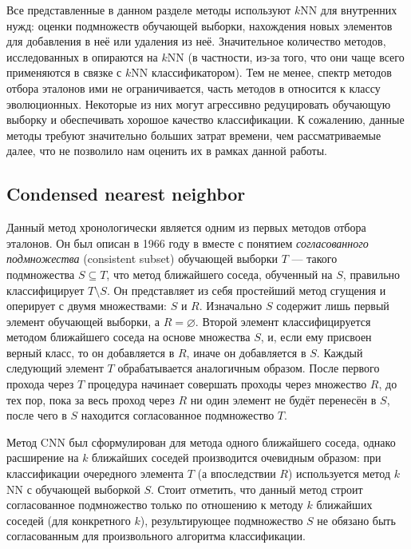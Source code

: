 Все представленные в данном разделе методы используют \(k\)NN для внутренних нужд: оценки подмножеств обучающей выборки, нахождения новых элементов для добавления в неё или удаления из неё. Значительное количество методов, исследованных в \cite{ps-taxonomy} опираются на \(k\)NN (в частности, из-за того, что они чаще всего применяются в связке с \(k\)NN классификатором). Тем не менее, спектр методов отбора эталонов ими не ограничивается, часть методов в \cite{ps-taxonomy} относится к классу эволюционных. Некоторые из них могут агрессивно редуцировать обучающую выборку и обеспечивать хорошое качество классификации. К сожалению, данные методы требуют значительно больших затрат времени, чем рассматриваемые далее, что не позволило нам оценить их в рамках данной работы.

\subsection{Condensed nearest neighbor}
Данный метод хронологически является одним из первых методов отбора эталонов. Он был описан в 1966 году в \cite{hart} вместе с понятием \emph{согласованного подмножества} (consistent subset) обучающей выборки \(T\) --- такого подмножества \(S\subseteq T\), что метод ближайшего соседа, обученный на \(S\), правильно классифицирует \(T\setminus S\). Он представляет из себя простейший метод сгущения и оперирует с двумя множествами: \(S\) и \(R\). Изначально \(S\) содержит лишь первый элемент обучающей выборки, а \(R=\varnothing\). Второй элемент классифицируется методом ближайшего соседа на основе множества \(S\), и, если ему присвоен верный класс, то он добавляется в \(R\), иначе он добавляется в \(S\). Каждый следующий элемент \(T\) обрабатывается аналогичным образом. После первого прохода через \(T\) процедура начинает совершать проходы через множество \(R\), до тех пор, пока за весь проход через \(R\) ни один элемент не будёт перенесён в \(S\), после чего в \(S\) находится согласованное подмножество \(T\).

Метод CNN был сформулирован для метода одного ближайшего соседа, однако расширение на \(k\) ближайших соседей производится очевидным образом: при классификации очередного элемента \(T\) (а впоследствии \(R\)) используется метод \(k\)NN с обучающей выборкой \(S\). Стоит отметить, что данный метод строит согласованное подмножество только по отношению к методу \(k\) ближайших соседей (для конкретного \(k\)), результирующее подмножество \(S\) не обязано быть согласованным для произвольного алгоритма классификации.

